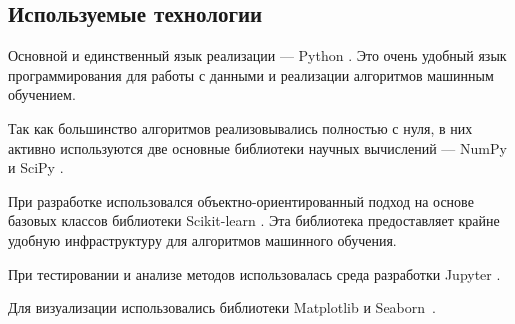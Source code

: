 \subsection{Используемые технологии}

Основной и единственный язык реализации --- Python \cite{python}. Это очень удобный язык программирования для работы с данными и реализации алгоритмов машинным обучением.

Так как большинство алгоритмов реализовывались полностью с нуля, в них активно используются две основные библиотеки научных вычислений --- NumPy \cite{numpy} и SciPy \cite{scipy}.

При разработке использовался объектно-ориентированный подход на основе базовых классов библиотеки Scikit-learn \cite{sklearn}. Эта библиотека предоставляет крайне удобную инфраструктуру для алгоритмов машинного обучения.

При тестировании и анализе методов использовалась среда разработки Jupyter \cite{jupyter}.

Для визуализации использовались библиотеки Matplotlib \cite{matplotlib} и Seaborn~\cite{seaborn}.
